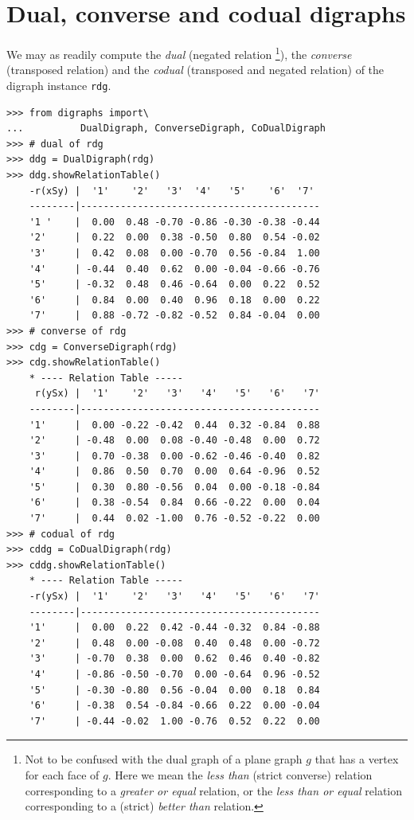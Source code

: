 \section{Dual, converse and codual digraphs}
\label{sec:2.6}

We may as readily compute the \emph{dual} (negated relation \footnote{Not to be confused with the dual graph of a plane graph $g$ that has a vertex for each face of $g$. Here we mean the \emph{less than} (strict converse) relation corresponding to a \emph{greater or equal} relation, or the \emph{less than or equal} relation corresponding to a (strict) \emph{better than} relation.}), the \emph{converse} (transposed relation) and the \emph{codual} (transposed and negated relation) of the digraph instance \texttt{rdg}. 
\begin{lstlisting}[caption={Computing associated dual, converse and codual digraphs},label=list:2.7]
>>> from digraphs import\
...          DualDigraph, ConverseDigraph, CoDualDigraph
>>> # dual of rdg
>>> ddg = DualDigraph(rdg)
>>> ddg.showRelationTable()
    -r(xSy) |  '1'    '2'   '3'  '4'   '5'    '6'  '7'	  
    --------|------------------------------------------
    '1 '    |  0.00  0.48 -0.70 -0.86 -0.30 -0.38 -0.44	 
    '2'     |  0.22  0.00  0.38 -0.50  0.80  0.54 -0.02	 
    '3'     |  0.42  0.08  0.00 -0.70  0.56 -0.84  1.00	 
    '4'     | -0.44  0.40  0.62  0.00 -0.04 -0.66 -0.76	 
    '5'     | -0.32  0.48  0.46 -0.64  0.00  0.22  0.52	 
    '6'     |  0.84  0.00  0.40  0.96  0.18  0.00  0.22	 
    '7'     |  0.88 -0.72 -0.82 -0.52  0.84 -0.04  0.00
>>> # converse of rdg
>>> cdg = ConverseDigraph(rdg)
>>> cdg.showRelationTable()
    * ---- Relation Table -----
     r(ySx) |  '1'    '2'   '3'   '4'   '5'   '6'   '7'	  
    --------|------------------------------------------
    '1'     |  0.00 -0.22 -0.42  0.44  0.32 -0.84  0.88	 
    '2'     | -0.48  0.00  0.08 -0.40 -0.48  0.00  0.72	 
    '3'     |  0.70 -0.38  0.00 -0.62 -0.46 -0.40  0.82	 
    '4'     |  0.86  0.50  0.70  0.00  0.64 -0.96  0.52	 
    '5'     |  0.30  0.80 -0.56  0.04  0.00 -0.18 -0.84	 
    '6'     |  0.38 -0.54  0.84  0.66 -0.22  0.00  0.04	 
    '7'     |  0.44  0.02 -1.00  0.76 -0.52 -0.22  0.00	 
>>> # codual of rdg
>>> cddg = CoDualDigraph(rdg)
>>> cddg.showRelationTable()
    * ---- Relation Table -----
    -r(ySx) |  '1'    '2'   '3'   '4'   '5'   '6'   '7'	    
    --------|------------------------------------------
    '1'     |  0.00  0.22  0.42 -0.44 -0.32  0.84 -0.88	 
    '2'     |  0.48  0.00 -0.08  0.40  0.48  0.00 -0.72	 
    '3'     | -0.70  0.38  0.00  0.62  0.46  0.40 -0.82	 
    '4'     | -0.86 -0.50 -0.70  0.00 -0.64  0.96 -0.52	 
    '5'     | -0.30 -0.80  0.56 -0.04  0.00  0.18  0.84	 
    '6'     | -0.38  0.54 -0.84 -0.66  0.22  0.00 -0.04	 
    '7'     | -0.44 -0.02  1.00 -0.76  0.52  0.22  0.00	 
\end{lstlisting}


